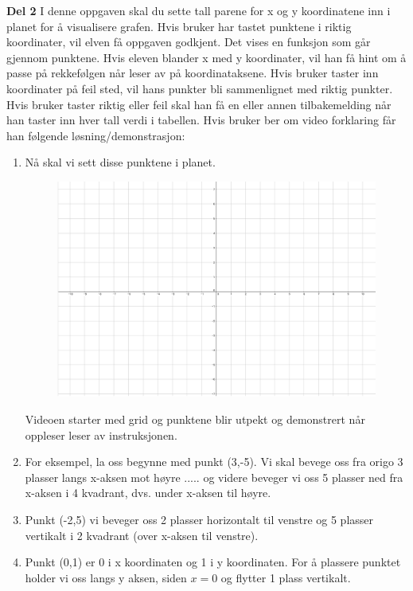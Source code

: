 \documentclass[12pt,twoside,onecolumn]{article}
\begin{document}
\begin{Exercise}
\textbf{Del 2} \newline
I denne oppgaven skal du sette tall parene for x og y koordinatene inn i planet for å visualisere grafen.\newline
{\color{Cerulean}Hvis bruker har tastet punktene i riktig koordinater, vil elven få oppgaven godkjent. Det vises en funksjon som går gjennom punktene.} \newline
{\color{Maroon}Hvis eleven blander x med y koordinater, vil han få hint om å passe på rekkefølgen når leser av på koordinataksene.}\newline
{\color{Cerulean}Hvis bruker taster inn koordinater på feil sted, vil hans punkter bli sammenlignet med riktig punkter.}
{\color{Cerulean}Hvis bruker taster riktig eller feil skal han få en eller annen tilbakemelding når han taster inn hver tall verdi i tabellen.}
\newline\newline
Hvis bruker ber om video forklaring får han følgende løsning/demonstrasjon:
\begin{enumerate}
\item {\color{Gray}Nå skal vi sett disse punktene i planet.} \newline
\begin{figure}[h!]
\includegraphics[scale = 0.1]{figures/Grid.png}
\end{figure}
{\color{PineGreen} Videoen starter med grid og punktene blir utpekt og demonstrert når oppleser leser av instruksjonen.}
\item {\color{Gray}For eksempel, la oss begynne med punkt (3,-5). Vi skal bevege oss fra origo 3 plasser langs x-aksen mot høyre ..... og videre beveger vi oss 5 plasser ned fra x-aksen i 4 kvadrant,  dvs. under x-aksen til høyre.}
\item {\color{Gray}Punkt (-2,5) vi beveger oss 2 plasser horizontalt til venstre og 5 plasser vertikalt i 2 kvadrant (over x-aksen til venstre).}
\item {\color{Gray}Punkt (0,1) er 0 i x koordinaten og 1 i y koordinaten. For å plassere punktet holder vi oss langs y aksen, siden $x=0$ og flytter 1 plass vertikalt.}
\end{enumerate}
\end{Exercise}
\end{document}
